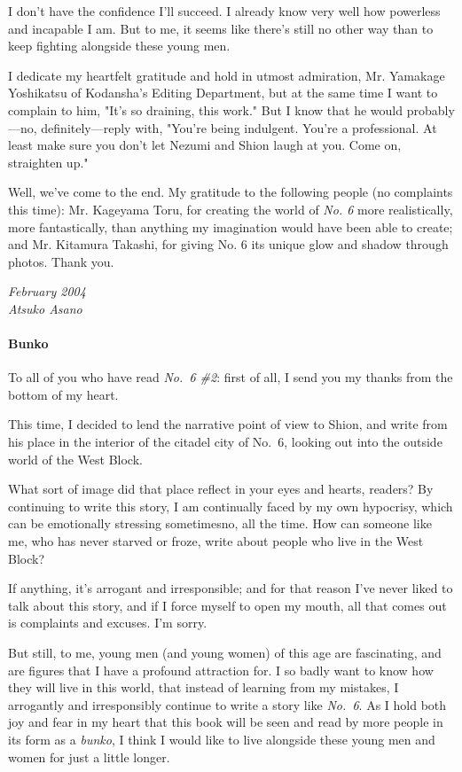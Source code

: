 I don't have the confidence I'll succeed. I already know very well how
powerless and incapable I am. But to me, it seems like there's still no
other way than to keep fighting alongside these young men.

I dedicate my heartfelt gratitude and hold in utmost admiration, Mr.
Yamakage Yoshikatsu of Kodansha's Editing Department, but at the same
time I want to complain to him, "It's so draining, this work." But I
know that he would probably---no, definitely---reply with, "You're being
indulgent. You're a professional. At least make sure you don't let
Nezumi and Shion laugh at you. Come on, straighten up."

Well, we've come to the end. My gratitude to the following people (no
complaints this time): Mr. Kageyama Toru, for creating the world of \emph{No.
6} more realistically, more fantastically, than anything my imagination
would have been able to create; and Mr. Kitamura Takashi, for giving No.
6 its unique glow and shadow through photos. Thank you.

\myspace

\emph{February 2004\\
Atsuko Asano}

\paragraph{Bunko}

To all of you who have read \emph{No.~6 \#2}: first of all, I send you my
thanks from the bottom of my heart.

This time, I decided to lend the narrative point of view to Shion, and
write from his place in the interior of the citadel city of No.~6,
looking out into the outside world of the West Block.

What sort of image did that place reflect in your eyes and hearts,
readers? By continuing to write this story, I am continually faced by my
own hypocrisy, which can be emotionally stressing sometimes\el no, all
the time. How can someone like me, who has never starved or froze, write
about people who live in the West Block?

If anything, it's arrogant and irresponsible; and for that reason I've
never liked to talk about this story, and if I force myself to open my
mouth, all that comes out is complaints and excuses. I'm sorry.

But still, to me, young men (and young women) of this age are
fascinating, and are figures that I have a profound attraction for. I so
badly want to know how they will live in this world, that instead of
learning from my mistakes, I arrogantly and irresponsibly continue to
write a story like \emph{No.~6}. As I hold both joy and fear in my heart that
this book will be seen and read by more people in its form as a \emph{bunko}, I
think I would like to live alongside these young men and women for just
a little longer.

